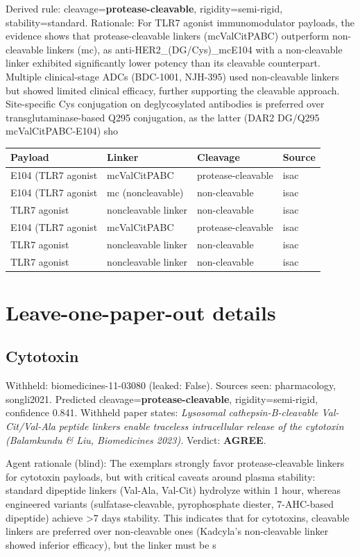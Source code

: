 \documentclass[10pt]{article}
\begin{document}
Derived rule: cleavage=\textbf{protease-cleavable}, rigidity=semi-rigid, stability=standard. Rationale: For TLR7 agonist immunomodulator payloads, the evidence shows that protease-cleavable linkers (mcValCitPABC) outperform non-cleavable linkers (mc), as anti-HER2\_(DG/Cys)\_mcE104 with a non-cleavable linker exhibited significantly lower potency than its cleavable counterpart. Multiple clinical-stage ADCs (BDC-1001, NJH-395) used non-cleavable linkers but showed limited clinical efficacy, further supporting the cleavable approach. Site-specific Cys conjugation on deglycosylated antibodies is preferred over transglutaminase-based Q295 conjugation, as the latter (DAR2 DG/Q295 mcValCitPABC-E104) sho
\begin{table}[h]\centering\scriptsize\begin{tabular}{l l l l}\toprule Payload & Linker & Cleavage & Source \\ \midrule E104 (TLR7 agonist & mcValCitPABC & protease-cleavable & isac \\
E104 (TLR7 agonist & mc (noncleavable) & non-cleavable & isac \\
TLR7 agonist & noncleavable linker & non-cleavable & isac \\
E104 (TLR7 agonist & mcValCitPABC & protease-cleavable & isac \\
TLR7 agonist & noncleavable linker & non-cleavable & isac \\
TLR7 agonist & noncleavable linker & non-cleavable & isac \\ \bottomrule\end{tabular}\end{table}
\section{Leave-one-paper-out details}
\subsection{Cytotoxin}
Withheld: biomedicines-11-03080 (leaked: False). Sources seen: pharmacology, songli2021. Predicted cleavage=\textbf{protease-cleavable}, rigidity=semi-rigid, confidence 0.841. Withheld paper states: \emph{Lysosomal cathepsin-B-cleavable Val-Cit/Val-Ala peptide linkers enable traceless intracellular release of the cytotoxin (Balamkundu \& Liu, Biomedicines 2023).} Verdict: \textbf{AGREE}.

Agent rationale (blind): The exemplars strongly favor protease-cleavable linkers for cytotoxin payloads, but with critical caveats around plasma stability: standard dipeptide linkers (Val-Ala, Val-Cit) hydrolyze within 1 hour, whereas engineered variants (sulfatase-cleavable, pyrophosphate diester, 7-AHC-based dipeptide) achieve >7 days stability. This indicates that for cytotoxins, cleavable linkers are preferred over non-cleavable ones (Kadcyla's non-cleavable linker showed inferior efficacy), but the linker must be s
\end{document}
